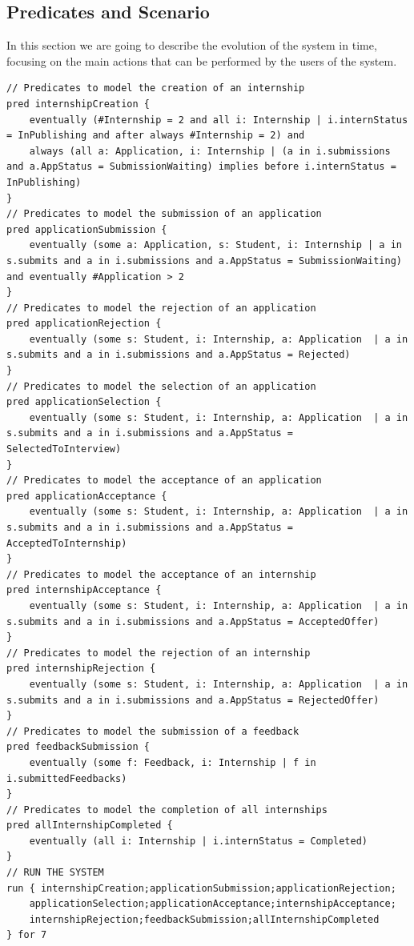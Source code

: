 \subsection{Predicates and Scenario}
In this section we are going to describe the evolution of the system in time, 
focusing on the main actions that can be performed by the users of the system.

\begin{lstlisting}
// Predicates to model the creation of an internship
pred internshipCreation {
    eventually (#Internship = 2 and all i: Internship | i.internStatus = InPublishing and after always #Internship = 2) and 
	always (all a: Application, i: Internship | (a in i.submissions and a.AppStatus = SubmissionWaiting) implies before i.internStatus = InPublishing)
}
// Predicates to model the submission of an application
pred applicationSubmission {
    eventually (some a: Application, s: Student, i: Internship | a in s.submits and a in i.submissions and a.AppStatus = SubmissionWaiting) and eventually #Application > 2
}
// Predicates to model the rejection of an application
pred applicationRejection {
    eventually (some s: Student, i: Internship, a: Application  | a in s.submits and a in i.submissions and a.AppStatus = Rejected)
}
// Predicates to model the selection of an application
pred applicationSelection {
    eventually (some s: Student, i: Internship, a: Application  | a in s.submits and a in i.submissions and a.AppStatus = SelectedToInterview)
}
// Predicates to model the acceptance of an application
pred applicationAcceptance {
    eventually (some s: Student, i: Internship, a: Application  | a in s.submits and a in i.submissions and a.AppStatus = AcceptedToInternship)
}
// Predicates to model the acceptance of an internship
pred internshipAcceptance {
    eventually (some s: Student, i: Internship, a: Application  | a in s.submits and a in i.submissions and a.AppStatus = AcceptedOffer)
}
// Predicates to model the rejection of an internship
pred internshipRejection {
    eventually (some s: Student, i: Internship, a: Application  | a in s.submits and a in i.submissions and a.AppStatus = RejectedOffer)
}
// Predicates to model the submission of a feedback
pred feedbackSubmission {
    eventually (some f: Feedback, i: Internship | f in i.submittedFeedbacks)
}
// Predicates to model the completion of all internships
pred allInternshipCompleted {
    eventually (all i: Internship | i.internStatus = Completed)
}
// RUN THE SYSTEM
run { internshipCreation;applicationSubmission;applicationRejection;
    applicationSelection;applicationAcceptance;internshipAcceptance;
    internshipRejection;feedbackSubmission;allInternshipCompleted 
} for 7
\end{lstlisting}

